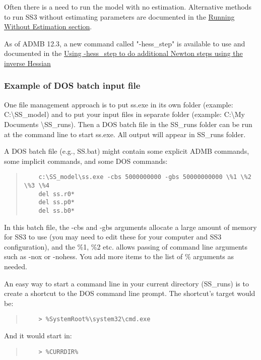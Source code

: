 Often there is a need to run the model with no estimation. Alternative methods to run SS3 without estimating parameters are documented in the \hyperlink{NoEst}{Running Without Estimation section}. 

As of ADMB 12.3, a new command called "-hess\_step" is available to use and documented in the \hyperlink{hess-step}{Using -hess\_step to do additional Newton steps using the inverse Hessian}

\subsubsection{Example of DOS batch input file}
One file management approach is to put ss.exe in its own folder (example:  C:\textbackslash SS\_model) and to put your input files in separate folder (example:  C:\textbackslash My Documents \textbackslash SS\_runs).  Then a DOS batch file in the SS\_runs folder can be run at the command line to start ss.exe.  All output will appear in SS\_runs folder.

A DOS batch file (e.g., SS.bat) might contain some explicit ADMB commands, some implicit commands, and some DOS commands:

\begin{quote}
	\begin{verbatim}
	c:\SS_model\ss.exe -cbs 5000000000 -gbs 50000000000 \%1 \%2 \%3 \%4 
	del ss.r0*
	del ss.p0*
	del ss.b0*
	\end{verbatim}
\end{quote}


In this batch file, the -cbs and -gbs arguments allocate a large amount of memory for SS3 to use (you may need to edit these for your computer and SS3 configuration), and the \%1, \%2 etc. allows passing of command line arguments such as -nox or -nohess.  You add more items to the list of \% arguments as needed.

An easy way to start a command line in your current directory (SS\_runs) is to create a shortcut to the DOS command line prompt.  The shortcut's target would be:

\begin{quote}
	\begin{verbatim}
	> %SystemRoot%\system32\cmd.exe
	\end{verbatim}
\end{quote}


\noindent And it would start in:
\begin{quote}
	\begin{verbatim}
	> %CURRDIR%
	\end{verbatim}
\end{quote}

